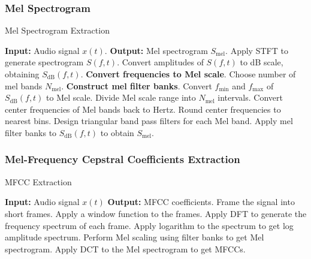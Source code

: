\subsubsection{Mel Spectrogram}
\begin{algorithm}[H]
    \caption{Mel Spectrogram Extraction}
    \begin{algorithmic}[1]

        \STATE \textbf{Input:} Audio signal $x(t)$.
        \STATE \textbf{Output:} Mel spectrogram $S_{\text{mel}}$.
        \STATE Apply STFT to generate spectrogram $S(f, t)$.
        \STATE Convert amplitudes of $S(f, t)$ to dB scale, obtaining $S_{\text{dB}}(f, t)$.
        \STATE \textbf{Convert frequencies to Mel scale}.
        \STATE \hspace{10} Choose number of mel bands $N_{\text{mel}}$.
        \STATE \textbf{Construct mel filter banks}.
        \STATE \hspace{10} Convert $f_{\text{min}}$ and $f_{\text{max}}$ of $S_{\text{dB}}(f, t)$ to Mel scale.
        \STATE \hspace{10} Divide Mel scale range into $N_{\text{mel}}$ intervals.
        \STATE \hspace{10} Convert center frequencies of Mel bands back to Hertz.
        \STATE \hspace{10} Round center frequencies to nearest bins.
        \STATE \hspace{10} Design triangular band pass filters for each Mel band.
        \STATE \hspace{10} Apply mel filter banks to $S_{\text{dB}}(f, t)$ to obtain $S_{\text{mel}}$.
    \end{algorithmic}
\end{algorithm}

\subsubsection{Mel-Frequency Cepstral Coefficients Extraction}

\begin{algorithm}[H]
    \caption{MFCC Extraction}
    \begin{algorithmic}[1]

        \STATE \textbf{Input:} Audio signal $x(t)$
        \STATE \textbf{Output:} MFCC coefficients.
        \STATE Frame the signal into short frames.
        \STATE Apply a window function to the frames.
        \STATE Apply DFT to generate the frequency spectrum of each frame.
        \STATE Apply logarithm to the spectrum to get log amplitude spectrum.
        \STATE Perform Mel scaling using filter banks to get Mel spectrogram.
        \STATE Apply DCT to the Mel spectrogram to get MFCCs.
    \end{algorithmic}
\end{algorithm}

